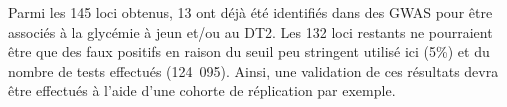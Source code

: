 \documentclass[11pt, a4paper]{article}
\begin{document}
\begin{figure}[h]
    \begin{center}
        \label{fig:results}
    \end{center}
\end{figure}
\par{Parmi les 145 loci obtenus, 13 ont déjà été identifiés dans des GWAS \citep{welter_nhgri_2014} pour être associés à la glycémie à jeun et/ou au DT2.
Les 132 loci restants ne pourraient être que des faux positifs en raison du seuil peu stringent utilisé ici (5\%) et du nombre de tests effectués (124~095).
Ainsi, une validation de ces résultats devra être effectués à l'aide d'une cohorte de réplication par exemple.}
\end{document}
